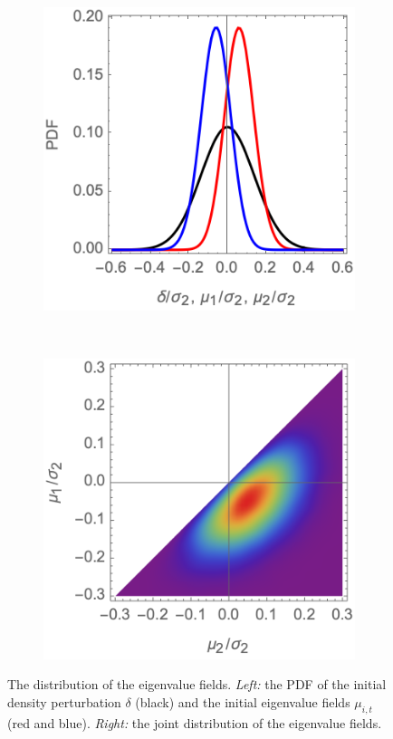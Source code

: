 \documentclass[a4paper, 11pt]{article}
\begin{document}
\begin{figure}
\centering
\begin{subfigure}[b]{0.45\textwidth}
\includegraphics[width=\textwidth]{eigen_dens}
\end{subfigure}~
\begin{subfigure}[b]{0.45\textwidth}
\includegraphics[width=\textwidth]{joint_eigen}
\end{subfigure}
\caption{The distribution of the eigenvalue fields. \textit{Left:} the PDF of the initial density perturbation $\delta$ (black) and the initial eigenvalue fields $\mu_{i,t}$ (red and blue). \textit{Right:} the joint distribution of the eigenvalue fields.}\label{fig:eigen_stats}
\end{figure}
\end{document}
